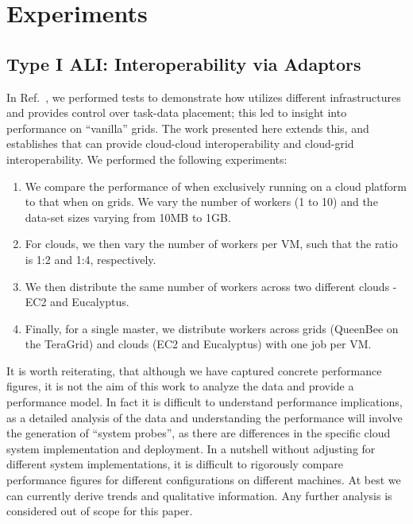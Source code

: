 \documentclass[3p,twocolumn]{elsarticle}
\begin{document}
\section{Experiments}
\label{sec:exp}

\subsection{Type I ALI: Interoperability via Adaptors}

In Ref.~\cite{saga_ccgrid09}, we performed tests to demonstrate how
\sagamapreduce utilizes different infrastructures and provides control
over task-data placement; this led to insight into performance on
``vanilla'' grids.  The work presented here extends this, and
establishes that \sagamapreduce can provide cloud-cloud
interoperability and cloud-grid interoperability.  We performed the
following experiments:

\begin{enumerate}

 \item We compare the performance of \sagamapreduce when exclusively
 running on a cloud platform to that when on grids. We vary the number
 of workers (1 to 10) and the data-set sizes varying from 10MB to 1GB.

 \item For clouds, we then vary the number of workers per VM, such
 that the ratio is 1:2 and 1:4, respectively.

 \item We then distribute the same number of workers across two
 different clouds - EC2 and Eucalyptus.

 \item Finally, for a single master, we distribute workers across
 grids (QueenBee on the TeraGrid) and clouds (EC2 and Eucalyptus) with
 one job per VM.

\end{enumerate}

It is worth reiterating, that although we have captured concrete
performance figures, it is not the aim of this work to analyze the
data and provide a performance model. In fact it is difficult to
understand performance implications, as a detailed analysis of the
data and understanding the performance will involve the generation of
``system probes'', as there are differences in the specific cloud
system implementation and deployment.  In a nutshell without adjusting
for different system implementations, it is difficult to rigorously
compare performance figures for different configurations on different
machines. At best we can currently derive trends and qualitative
information.  Any further analysis is considered out of scope for this
paper.
\end{document}
